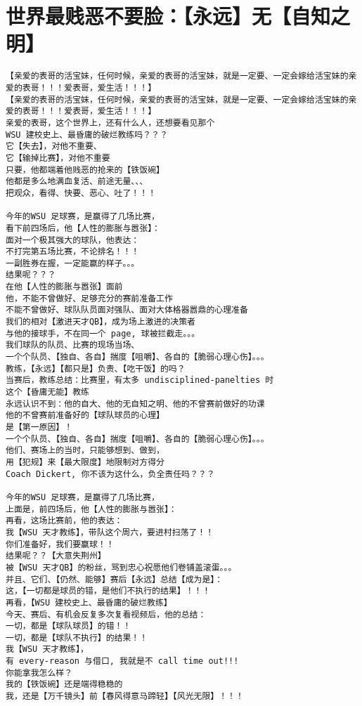 \documentclass[9pt, b5paper]{article}
\begin{document}
\section{世界最贱恶不要脸：【永远】无【自知之明】}
\label{sec-12}
\begin{verbatim}
【亲爱的表哥的活宝妹，任何时候，亲爱的表哥的活宝妹，就是一定要、一定会嫁给活宝妹的亲爱的表哥！！！爱表哥，爱生活！！！】
【亲爱的表哥的活宝妹，任何时候，亲爱的表哥的活宝妹，就是一定要、一定会嫁给活宝妹的亲爱的表哥！！！爱表哥，爱生活！！！】
亲爱的表哥，这个世界上，还有什么人，还想要看见那个
WSU 建校史上、最昏庸的破烂教练吗？？？
它【失去】，对他不重要、
它【输掉比赛】，对他不重要
只要，他都端着他贱恶的抢来的【铁饭碗】
他都是多么地满血复活、前途无量、、、
把观众，看得、快要、恶心、吐了！！！

今年的WSU 足球赛，是赢得了几场比赛，
看下前四场后，他【人性的膨胀与嚣张】：
面对一个极其强大的球队，他表达：
不打完第五场比赛，不论排名！！！
一副胜券在握，一定能赢的样子。。。
结果呢？？？
在他【人性的膨胀与嚣张】面前
他，不能不曾做好、足够充分的赛前准备工作
不能不曾做好、球队队员面对强队、面对大体格器嚣鼎的心理准备
我们的相对【激进天才QB】，成为场上激进的决策者
与他的接球手，不在同一个 page, 球被拦截走。。。
我们球队的队员、比赛的现场当场、
一个个队员、【独自、各自】揣度【咀嚼】、各自的【脆弱心理心伤】。。。
教练，【永远】【都只是】负责、【吃干饭】的吗？
当赛后，教练总结：比赛里，有太多 undisciplined-panelties 时
这个【昏庸无能】教练
永远认识不到：他的自大、他的无自知之明、他的不曾赛前做好的功课
他的不曾赛前准备好的【球队球员的心理】
是【第一原因】！
一个个队员、【独自、各自】揣度【咀嚼】、各自的【脆弱心理心伤】。。。
他们、赛场上的当时，只能够想到、做到，
用【犯规】来【最大限度】地限制对方得分
Coach Dickert, 你不该为这什么，负全责任吗？？？

今年的WSU 足球赛，是赢得了几场比赛，
上面是，前四场后，他【人性的膨胀与嚣张】：
再看，这场比赛前，他的表达：
我【WSU 天才教练】，带队这个周六，要进村扫荡了！！
你们准备好，我们要赢球！！
结果呢？？【大意失荆州】
被【WSU 天才QB】的粉丝，骂到忠心祝愿他们卷铺盖滚蛋。。。
并且、它们、【仍然、能够】赛后【永远】总结【成为是】：
这，【一切都是球员的错，是他们不执行的结果】！！！
再看，【WSU 建校史上、最昏庸的破烂教练】
今天、赛后、有机会反复多次复看视频后，他的总结：
一切，都是【球队球员】的错！！
一切，都是【球队不执行】的结果！！
我【WSU 天才教练】，
有 every-reason 与借口, 我就是不 call time out!!!
你能拿我怎么样？
我的【铁饭碗】还是端得稳稳的
我，还是【万千镜头】前【春风得意马蹄轻】【风光无限】！！！


\end{verbatim}
\end{document}
